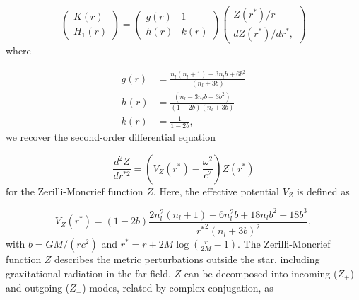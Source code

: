 \documentclass[aps,prd,twocolumn,superscriptaddress,footinbib]{revtex4-1}
\begin{document}
\begin{equation} \label{zerilli_ic}
\left(\begin{array}{c}
K(r) \\
H_{1}(r)
\end{array}\right)=\left(\begin{array}{lc}
g(r) & 1 \\
h(r) & k(r)
\end{array}\right)\left(\begin{array}{c}
Z\left(r^{*}\right) / r \\
d Z\left(r^{*}\right) / d r^{*} ,
\end{array}\right)
\end{equation}
where

\begin{equation}
\begin{aligned}
g(r) &=\frac{n_l(n_l+1)+3 n_l b+6 b^{2}}{(n_l+3 b)} \\
h(r) &=\frac{\left(n_l-3 n_l b-3 b^{2}\right)}{(1-2 b)(n_l+3 b)} \\
k(r) &=\frac{1}{1-2 b} ,
\end{aligned}
\end{equation}
we recover the second-order differential equation

\begin{equation} \label{ze}
\frac{d^{2} Z}{d r^{* 2}}=\left(V_{Z}(r^*)-\frac{\omega^{2}}{c^2}\right) Z(r^*)
\end{equation}
for the Zerilli-Moncrief function $Z$. Here, the effective potential $V_{Z}$ is defined as

\begin{equation}
V_{Z}(r^*)=(1-2 b) \frac{2 n_l^{2}(n_l+1)+6 n_l^{2} b+18 n_l b^{2}+18 b^{3}}{{r^*}^{2}(n_l+3 b)^{2}} ,
\end{equation}
with $b = G M/(r c^2)$ and $r^* = r + 2M\log(\frac{r}{2M}-1)$. The Zerilli-Moncrief function $Z$ describes the metric perturbations outside the star, including gravitational radiation in the far field. $Z$ can be decomposed into incoming ($Z_+$) and outgoing ($Z_-$) modes, related by complex conjugation, as~\cite{1971}
\end{document}
